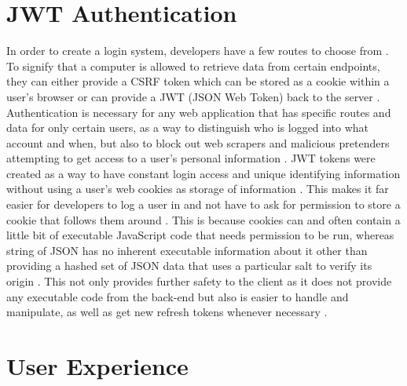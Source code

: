 \section{JWT Authentication}

In order to create a login system, developers have a few routes to choose from \cite{Copes_2021}. To signify that a computer is allowed to retrieve data from certain endpoints, they can either provide a CSRF token which can be stored as a cookie within a user’s browser or can provide a JWT (JSON Web Token) back to the server \cite{Copes_2021}. Authentication is necessary for any web application that has specific routes and data for only certain users, as a way to distinguish who is logged into what account and when, but also to block out web scrapers and malicious pretenders attempting to get access to a user’s personal information \cite{Copes_2021, Ekler_Levendovszky_Janoky_2018}.
\newline
\newline
JWT tokens were created as a way to have constant login access and unique identifying information without using a user’s web cookies as storage of information \cite{Copes_2021}. This makes it far easier for developers to log a user in and not have to ask for permission to store a cookie that follows them around \cite{Copes_2021}. This is because cookies can and often contain a little bit of executable JavaScript code that needs permission to be run, whereas string of JSON has no inherent executable information about it other than providing a hashed set of JSON data that uses a particular salt to verify its origin \cite{Copes_2021}. This not only provides further safety to the client as it does not provide any executable code from the back-end but also is easier to handle and manipulate, as well as get new refresh tokens whenever necessary \cite{Copes_2021}.

\section{User Experience}

